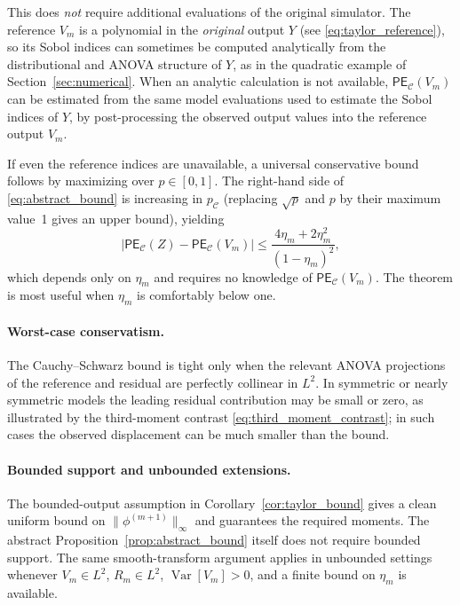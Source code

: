 \documentclass[11pt,letterpaper]{article}
\DeclareMathOperator{\Var}{Var}
\theoremstyle{remark}
\begin{document}
This does \emph{not} require additional evaluations of the original simulator.
The reference $V_m$ is a polynomial in the \emph{original} output $Y$
(see \eqref{eq:taylor_reference}), so its Sobol indices can sometimes be
computed analytically from the distributional and ANOVA structure of $Y$, as in
the quadratic example of Section~\ref{sec:numerical}. When an analytic
calculation is not available, $\mathsf{PE}_{\mathscr C}(V_m)$ can be estimated
from the same model evaluations used to estimate the Sobol indices of $Y$, by
post-processing the observed output values into the reference output $V_m$.

If even the reference indices are unavailable, a universal conservative bound
follows by maximizing over $p\in[0,1]$. The right-hand side of
\eqref{eq:abstract_bound} is increasing in $p_{\mathscr C}$ (replacing
$\sqrt{p}$ and $p$ by their maximum value~1 gives an upper bound), yielding
\begin{equation}
  \left|\mathsf{PE}_{\mathscr C}(Z)-\mathsf{PE}_{\mathscr C}(V_m)\right|
  \leq
  \frac{4\eta_m+2\eta_m^2}{(1-\eta_m)^2},
  \label{eq:universal_bound}
\end{equation}
which depends only on $\eta_m$ and requires no knowledge of $\mathsf{PE}_{\mathscr C}(V_m)$.
The theorem is most useful when $\eta_m$ is comfortably below one.

\paragraph{Worst-case conservatism.}
The Cauchy--Schwarz bound is tight only when the relevant ANOVA projections of
the reference and residual are perfectly collinear in $L^2$. In symmetric or
nearly symmetric models the leading residual contribution may be small or zero,
as illustrated by the third-moment contrast \eqref{eq:third_moment_contrast}; in
such cases the observed displacement can be much smaller than the bound.

\paragraph{Bounded support and unbounded extensions.}
The bounded-output assumption in Corollary~\ref{cor:taylor_bound} gives a clean
uniform bound on $\|\phi^{(m+1)}\|_\infty$ and guarantees the required moments.
The abstract Proposition~\ref{prop:abstract_bound} itself does not require
bounded support. The same smooth-transform argument applies in unbounded settings
whenever $V_m\in L^2$, $R_m\in L^2$, $\Var[V_m]>0$, and a finite bound on
$\eta_m$ is available.
\end{document}
